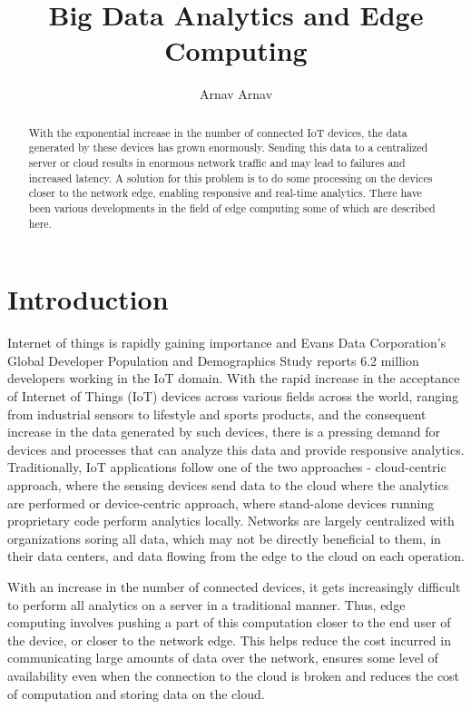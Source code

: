 \documentclass[sigconf]{acmart}
\begin{document}
\title{Big Data Analytics and Edge Computing}


\author{Arnav Arnav}

\begin{abstract}
With the exponential increase in the number of connected IoT devices, the data generated by these devices has grown enormously. Sending this data to a centralized server or cloud results in enormous network traffic and may lead to failures and increased latency. A solution for this problem is to do some processing on the devices closer to the network edge, enabling responsive and real-time analytics. There have been various developments in the field of edge computing some of which are described here.
\end{abstract}

\maketitle
\section{Introduction}
Internet of things is rapidly gaining importance and Evans Data Corporation’s Global Developer Population and Demographics Study reports 6.2 million developers working in the IoT domain\cite{ibm_data_streaming_analytics}. With the rapid increase in the acceptance of Internet of Things (IoT) devices across various fields across the world, ranging from industrial sensors to lifestyle and sports products, and the consequent increase in the data generated by such devices, there is a pressing demand for devices and processes that can analyze this data and provide responsive analytics\cite{ieee_iot_cloud_analytics_newsletter}. Traditionally, IoT applications follow one of the two approaches - cloud-centric approach, where the sensing devices send data to the cloud where the analytics are performed or device-centric approach, where stand-alone devices running proprietary code perform analytics locally\cite{ieee_iot_cloud_analytics_newsletter}. Networks are largely centralized with  organizations soring all data, which may not be directly beneficial to them, in their data centers, and data flowing from the edge to the cloud on each operation\cite{ibm_iot_edge}.

With an increase in the number of connected devices, it gets increasingly difficult to perform all analytics on a server in a traditional manner. Thus, edge computing involves pushing a part of this computation closer to the end user of the device, or closer to the network edge\cite{wiki-edge-computing}\cite{ibm_iot_edge}. This helps reduce the cost incurred in communicating large amounts of data over the network, ensures some level of availability even when the connection to the cloud is broken and reduces the cost of computation and storing data on the cloud\cite{ieee_iot_cloud_analytics_newsletter}\cite{ibm_iot_edge}.
\end{document}
